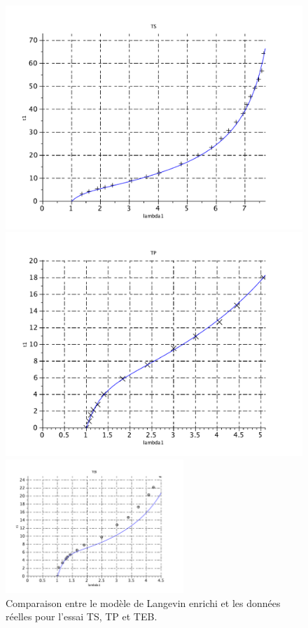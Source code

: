 \documentclass[a4paper,11pt]{article}
\begin{document}
\begin{figure}[!ht]
\begin{minipage}{0.49\linewidth}
	\centering\includegraphics[scale=0.45]{scilab_prof/q421.pdf}
\end{minipage}
	\hfill
\begin{minipage}{0.49\linewidth}
	\centering\includegraphics[scale=0.45]{scilab_prof/q422.pdf}
\end{minipage}
\centering\includegraphics[width=0.6\textwidth]{scilab_prof/q423.pdf}
\caption{Comparaison entre le modèle de Langevin enrichi et les données réelles pour l'essai TS, TP et TEB.}
\label{fig:43}
\end{figure}
\end{document}
